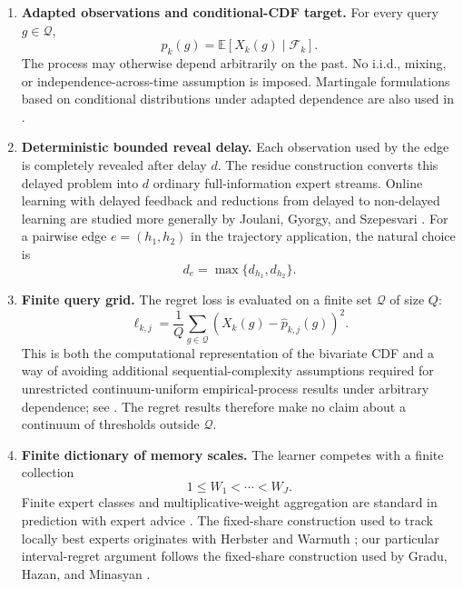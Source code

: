 \documentclass[11pt]{article}
\newcommand{\E}{\mathbb{E}}
\newcommand{\F}{\mathcal{F}}
\newcommand{\Q}{\mathcal{Q}}
\newcommand{\1}{\mathbf{1}}
\begin{document}
\begin{enumerate}[leftmargin=*]

    \item \textbf{Adapted observations and conditional-CDF target.}
    For every query $g\in\Q$,
    \[
        p_k(g)
        =
        \E[X_k(g)\mid\F_k].
    \]
    The process may otherwise depend arbitrarily on the past.  No i.i.d.,
    mixing, or independence-across-time assumption is imposed.
    Martingale formulations based on conditional distributions under adapted
    dependence are also used in
    \cite{rakhlin2015,yin2022,mineiro2023}.

    \item \textbf{Deterministic bounded reveal delay.}
    Each observation used by the edge is completely revealed after delay $d$.
    The residue construction converts this delayed problem into $d$
    ordinary full-information expert streams.  Online learning with delayed
    feedback and reductions from delayed to non-delayed learning are studied
    more generally by Joulani, Gyorgy, and Szepesvari
    \cite{joulani2013}.
    For a pairwise edge $e=(h_1,h_2)$ in the trajectory application, the
    natural choice is
    \[
        d_e=\max\{d_{h_1},d_{h_2}\}.
    \]

    \item \textbf{Finite query grid.}
    The regret loss is evaluated on a finite set
    $\Q$ of size $Q$:
    \[
        \ell_{k,j}
        =
        \frac1Q
        \sum_{g\in\Q}
        (X_k(g)-\widehat p_{k,j}(g))^2.
    \]
    This is both the computational representation of the bivariate CDF and a
    way of avoiding additional sequential-complexity assumptions required for
    unrestricted continuum-uniform empirical-process results under arbitrary
    dependence; see \cite{rakhlin2015}.  The regret results therefore make no
    claim about a continuum of thresholds outside $\Q$.

    \item \textbf{Finite dictionary of memory scales.}
    The learner competes with a finite collection
    \[
        1\le W_1<\cdots<W_J.
    \]
    Finite expert classes and multiplicative-weight aggregation are standard
    in prediction with expert advice \cite{cesabianchi2006}.  The
    fixed-share construction used to track locally best experts originates
    with Herbster and Warmuth \cite{herbster1998}; our particular
    interval-regret argument follows the fixed-share construction used by
    Gradu, Hazan, and Minasyan \cite{gradu2023}.


\end{enumerate}
\end{document}
